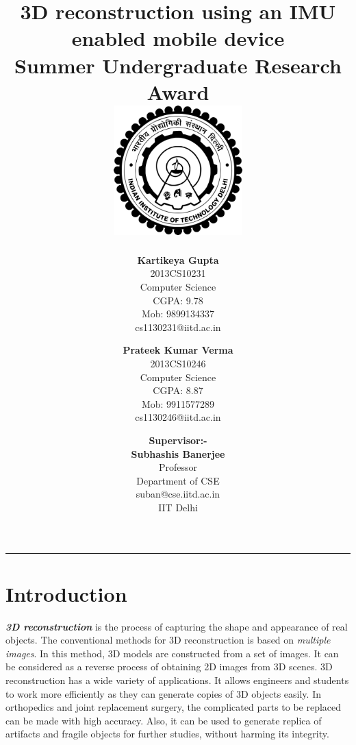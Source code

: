 \documentclass{article}
\title{\vspace*{\fill} \textbf{3D reconstruction using an IMU enabled mobile device}
	  \\ {\large \textbf{Summer Undergraduate Research Award}}
	  \\  \vspace{3mm} \includegraphics[width=5cm]{logo.png}}
\author{
	\textbf{Kartikeya Gupta}\\ 
	2013CS10231\\
	Computer Science\\
	CGPA: 9.78 \\
	Mob: 9899134337\\
	cs1130231@iitd.ac.in
	\and
	\textbf{Prateek Kumar Verma}\\ 
	2013CS10246\\
	Computer Science\\
	CGPA: 8.87\\
	Mob: 9911577289\\
	cs1130246@iitd.ac.in
}
\date{\textbf{Supervisor:-} \\ \textbf{Subhashis Banerjee} \\ Professor \\ Department of CSE \\ suban@cse.iitd.ac.in\\ IIT Delhi\\
\vspace*{\fill}}
\makeatletter
\newcommand{\namesigdate}[2][5cm]{%
  \begin{tabular}{@{}p{#1}@{}}
    #2 \\[0.4\normalbaselineskip] \hrule \\[0pt]
    {\small } \\[2\normalbaselineskip] 
  \end{tabular}
}
\makeatother
\begin{document}
	\maketitle


\begin{center}
\noindent\rule{3.2cm}{0.4pt} 
\end{center}



	\newpage
	
	\section{Introduction}
		\textit{\textbf{3D reconstruction}} is the process of capturing the shape and appearance of real objects. The conventional methods for 3D reconstruction is based on \textit{multiple images}. In this method, 3D models are constructed from a set of images. It can be considered as a reverse process of obtaining 2D images from 3D scenes.
		\newline
		3D reconstruction has a wide variety of applications. It allows engineers and students to work more efficiently as they can generate copies of 3D objects easily. In orthopedics and joint replacement surgery, the complicated parts to be replaced can be made with high accuracy. Also, it can be used to generate replica of artifacts and fragile objects for further studies, without harming its integrity.
\end{document}
